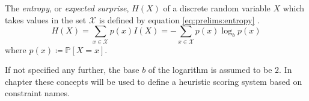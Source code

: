 		The \textit{entropy}, or \textit{expected surprise}, $H(X)$ of a discrete random variable $X$ which takes values in the set $\mathcal{X}$ is defined by equation \ref{eq:prelims:entropy} \cite{coverElementsInformationTheory2006}.
		\begin{equation}
		\label{eq:prelims:entropy}
			H(X) =  \sum_{x \in \mathcal{X}} p(x) I(X) = - \sum_{x \in \mathcal{X}} p(x) \log_b p(x)
		\end{equation}
		where $p(x) \coloneq \mathbb{P}[X = x]$.
		
		If not specified any further, the base $b$ of the logarithm is assumed to be $2$.
		In chapter  these concepts will be used to define a heuristic scoring system based on constraint names.
	